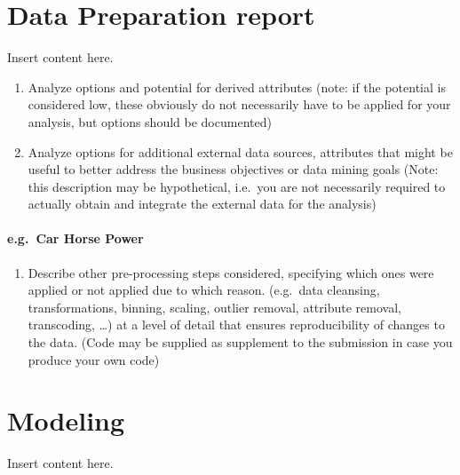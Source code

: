 \documentclass[sigchi]{acmart}
\def\tightlist{}
\begin{document}
\hypertarget{data-preparation-report}{%
\section{Data Preparation report}\label{data-preparation-report}}

Insert content here.

\begin{enumerate}
\def\labelenumi{\alph{enumi}.}
\tightlist
\item
  Analyze options and potential for derived attributes (note: if the potential is considered low, these obviously do not necessarily have to be applied for your analysis, but options should be documented)
\item
  Analyze options for additional external data sources, attributes that might be useful to better address the business objectives or data mining goals (Note: this description may be hypothetical, i.e.~you are not necessarily required to actually obtain and integrate the external data for the analysis)
\end{enumerate}

\hypertarget{e.g.-car-horse-power}{%
\paragraph{e.g.~Car Horse Power}\label{e.g.-car-horse-power}}

\begin{enumerate}
\def\labelenumi{\alph{enumi}.}
\setcounter{enumi}{2}
\tightlist
\item
  Describe other pre-processing steps considered, specifying which ones were applied or not applied due to which reason. (e.g.~data cleansing, transformations, binning, scaling, outlier removal, attribute removal, transcoding, \ldots) at a level of detail that ensures reproducibility of changes to the data. (Code may be supplied as supplement to the submission in case you produce your own code)
\end{enumerate}

\hypertarget{modeling}{%
\section{Modeling}\label{modeling}}

Insert content here.
\end{document}
